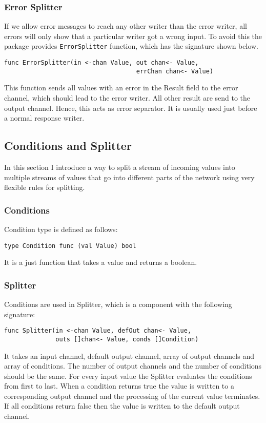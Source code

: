 \documentclass[12pt,a4paper]{article}
\begin{document}
\subsubsection{Error Splitter}
If we allow error messages to reach any other writer than the error writer,
all errors will only show that a particular writer got a wrong input.
To avoid this the package provides \texttt{ErrorSplitter} function, which
has the signature shown below.
\begin{lstlisting}
func ErrorSplitter(in <-chan Value, out chan<- Value, 
                                    errChan chan<- Value)
\end{lstlisting}
This function sends all values with an error in the Result field to the 
error channel, which should lead to the error writer. All other result 
are send to the output channel. Hence, this acts as error separator.
It is usually used just before a normal response writer.

\subsection{Conditions and Splitter}
In this section I introduce a way to split a stream of incoming values into
multiple streams of values that go into different parts of the network
using very flexible rules for splitting.

\subsubsection{Conditions}
Condition type is defined as follows:
\begin{lstlisting}
type Condition func (val Value) bool
\end{lstlisting}
It is a just function that takes a value and returns a boolean.

\subsubsection{Splitter}
Conditions are used in Splitter, which is a component with the 
following signature:
\begin{lstlisting}
func Splitter(in <-chan Value, defOut chan<- Value, 
			  outs []chan<- Value, conds []Condition)
\end{lstlisting}
It takes an input channel, default output channel, array of output channels and array of conditions.
The number of output channels and the number of conditions should be the same.
For every input value the Splitter evaluates the conditions from first to last.
When a condition returns true the value is written to a corresponding output channel 
and the processing of the current value terminates. If all conditions return false
then the value is written to the default output channel.
\end{document}
